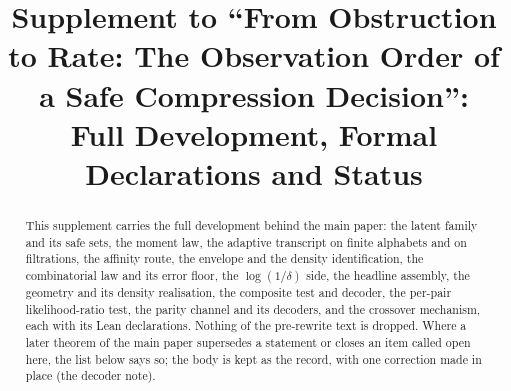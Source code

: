 



\title{Supplement to ``From Obstruction to Rate: The Observation Order of a Safe Compression
Decision'':\\ Full Development, Formal Declarations and Status}

\author{
}

\maketitle

\begin{abstract}
This supplement carries the full development behind the main paper: the latent family and its
safe sets, the moment law, the adaptive transcript on finite alphabets and on filtrations, the
affinity route, the envelope and the density identification, the combinatorial law and its
error floor, the $\log(1/\delta)$ side, the headline assembly, the geometry and its density
realisation, the composite test and decoder, the per-pair likelihood-ratio test, the parity
channel and its decoders, and the crossover mechanism, each with its Lean declarations. Nothing
of the pre-rewrite text is dropped. Where a later theorem of the main paper supersedes a
statement or closes an item called open here, the list below says so; the body is kept as the
record, with one correction made in place (the decoder note).
\end{abstract}

